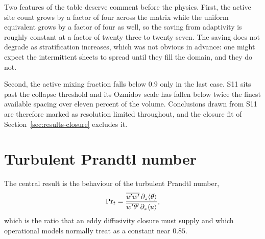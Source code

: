 Two features of the table deserve comment before the physics. First, the active
site count grows by a factor of four across the matrix while the uniform
equivalent grows by a factor of four as well, so the saving from adaptivity is
roughly constant at a factor of twenty three to twenty seven. The saving does
not degrade as stratification increases, which was not obvious in advance: one
might expect the intermittent sheets to spread until they fill the domain, and
they do not.

Second, the active mixing fraction falls below $0.9$ only in the last case. S11
sits past the collapse threshold and its Ozmidov scale has fallen below twice
the finest available spacing over eleven percent of the volume. Conclusions
drawn from S11 are therefore marked as resolution limited throughout, and the
closure fit of Section~\ref{sec:results-closure} excludes it.

\section{Turbulent Prandtl number}
\label{sec:results-prandtl}

The central result is the behaviour of the turbulent Prandtl number,
\begin{equation}
  \mathrm{Pr}_t = \frac{\overline{u'w'} \, \partial_z \langle \theta \rangle}
                 {\overline{w'\theta'} \, \partial_z \langle u \rangle},
  \label{eq:turbulent-prandtl}
\end{equation}
which is the ratio that an eddy diffusivity closure must supply and which
operational models normally treat as a constant near $0.85$.

